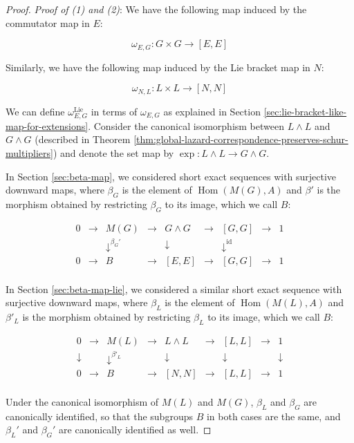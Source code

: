 \documentclass{ucetd}
\begin{document}
\begin{proof}
  {\em Proof of (1) and (2)}: We have the following map induced by the
  commutator map in $E$:

  $$\omega_{E,G}: G \times G \to [E,E]$$

  Similarly, we have the following map induced by the Lie bracket map
  in $N$:

  $$\omega_{N,L}: L \times L \to [N,N]$$

  We can define $\omega_{E,G}^{\text{Lie}}$ in terms of $\omega_{E,G}$
  as explained in Section
  \ref{sec:lie-bracket-like-map-for-extensions}. Consider the
  canonical isomorphism between $L \wedge L$ and $G \wedge G$
  (described in Theorem
  \ref{thm:global-lazard-correspondence-preserves-schur-multipliers})
  and denote the set map by $\exp:L \wedge L \to G \wedge G$.

  In Section \ref{sec:beta-map}, we
  considered short exact sequences with surjective downward maps,
  where $\beta_G$ is the element of $\operatorname{Hom}(M(G),A)$ and
  $\beta'$ is the morphism obtained by restricting $\beta_G$ to its
  image, which we call $B$:

  $$\begin{array}{ccccccccc}
    0 & \to & M(G) & \to & G \wedge G & \to & [G,G] & \to & 1\\
    &&   \downarrow^{\beta_G'}  &&  \downarrow     && \downarrow^{\text{id}} && \\
    0 & \to & B &\to & [E,E] & \to & [G,G] & \to & 1\\
  \end{array}$$

  In Section \ref{sec:beta-map-lie}, we considered a similar short
  exact sequence with surjective downward maps, where $\beta_L$ is the
  element of $\operatorname{Hom}(M(L),A)$ and $\beta'_L$ is the
  morphism obtained by restricting $\beta_L$ to its image, which we
  call $B$:

  $$\begin{array}{ccccccccc}
    0 & \to & M(L) & \to & L \wedge L & \to & [L,L] & \to & 1\\
    \downarrow &&   \downarrow^{\beta'_L}  &&  \downarrow     && \downarrow&& \downarrow\\
    0 & \to & B &\to & [N,N] & \to & [L,L] & \to & 1\\
  \end{array}$$

  Under the canonical isomorphism of $M(L)$ and $M(G)$, $\beta_L$ and
  $\beta_G$ are canonically identified, so that the subgroups $B$ in
  both cases are the same, and $\beta_L'$ and $\beta_G'$ are
  canonically identified as well.


\end{proof}
\end{document}
